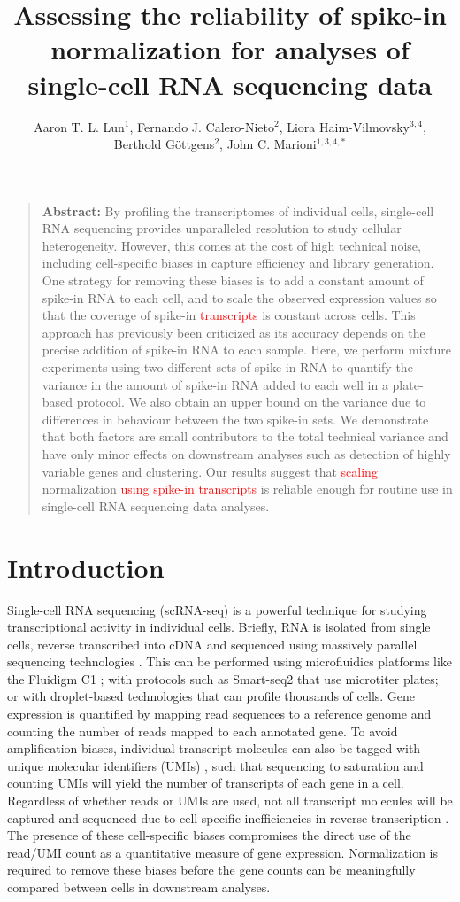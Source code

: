 \documentclass{article}
\title{Assessing the reliability of spike-in normalization for analyses of single-cell RNA sequencing data}
\author{Aaron T. L. Lun$^1$, Fernando J. Calero-Nieto$^2$, Liora Haim-Vilmovsky$^{3,4}$, \\ Berthold G\"ottgens$^2$, John C. Marioni$^{1,3,4,*}$}
\date{
    \begin{minipage}{0.9\textwidth}
        \begin{flushleft} 
            \begin{small}
                $^1$Cancer Research UK Cambridge Institute, University of Cambridge, Li Ka Shing Centre, Robinson Way, Cambridge CB2 0RE, United Kingdom \\
                $^2$Wellcome Trust and MRC Cambridge Stem Cell Institute, University of Cambridge, Wellcome Trust/MRC Building, Hills Road, Cambridge CB2 0XY, United Kingdom \\
                $^3$EMBL European Bioinformatics Institute, Wellcome Genome Campus, Hinxton, Cambridge CB10 1SD, United Kingdom \\
                $^4$Wellcome Trust Sanger Institute, Wellcome Genome Campus, Hinxton, Cambridge CB10 1SA, United Kingdom \\
                $^*$Corresponding author (email: marioni@ebi.ac.uk)
            \end{small}
        \end{flushleft}
    \end{minipage}\\[0.2in]
    \today{}
}
\newcommand{\revised}[1]{\textcolor{red}{#1}}
\begin{document}
\maketitle

\begin{quote}
\textbf{Abstract:}
By profiling the transcriptomes of individual cells, single-cell RNA sequencing provides unparalleled resolution to study cellular heterogeneity.
However, this comes at the cost of high technical noise, including cell-specific biases in capture efficiency and library generation.
One strategy for removing these biases is to add a constant amount of spike-in RNA to each cell, and to scale the observed expression values so that the coverage of spike-in \revised{transcripts} is constant across cells.
This approach has previously been criticized as its accuracy depends on the precise addition of spike-in RNA to each sample.
Here, we perform mixture experiments using two different sets of spike-in RNA to quantify the variance in the amount of spike-in RNA added to each well in a plate-based protocol.
We also obtain an upper bound on the variance due to differences in behaviour between the two spike-in sets.
We demonstrate that both factors are small contributors to the total technical variance and have only minor effects on downstream analyses such as detection of highly variable genes and clustering.
Our results suggest that \revised{scaling} normalization \revised{using spike-in transcripts} is reliable enough for routine use in single-cell RNA sequencing data analyses.
\end{quote}

\section*{Introduction}
Single-cell RNA sequencing (scRNA-seq) is a powerful technique for studying transcriptional activity in individual cells.
Briefly, RNA is isolated from single cells, reverse transcribed into cDNA and sequenced using massively parallel sequencing technologies \autocite{shapiro2013singlecell}.
This can be performed using microfluidics platforms like the Fluidigm C1 \autocite{pollen2014lowcoverage}; 
    with protocols such as Smart-seq2 \autocite{picelli2014full} that use microtiter plates;
    or with droplet-based technologies \autocite{klein2015droplet,macosko2015highly} that can profile thousands of cells.
Gene expression is quantified by mapping read sequences to a reference genome and counting the number of reads mapped to each annotated gene.
To avoid amplification biases, individual transcript molecules can also be tagged with unique molecular identifiers (UMIs) \autocite{islam2014quantitative}, such that sequencing to saturation and counting UMIs will yield the number of transcripts of each gene in a cell.
Regardless of whether reads or UMIs are used, not all transcript molecules will be captured and sequenced due to cell-specific inefficiencies in reverse transcription \autocite{stegle2015computational}.
The presence of these cell-specific biases compromises the direct use of the read/UMI count as a quantitative measure of gene expression.
Normalization is required to remove these biases before the gene counts can be meaningfully compared between cells in downstream analyses.
\end{document}
